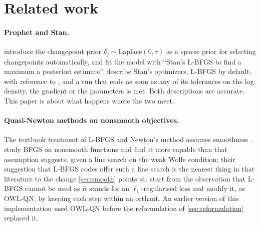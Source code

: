 \section{Related work}
\label{sec:related}

\paragraph{Prophet and Stan.}
\citet{taylor2018forecasting} introduce the changepoint prior
$\delta_j \sim \mathrm{Laplace}(0, \tau)$ as a sparse prior for selecting
changepoints automatically, and fit the model with ``Stan's L-BFGS to find a
maximum a posteriori estimate''. \citet{carpenter2017stan} describe Stan's
optimizers, L-BFGS by default, with reference to \citet{nocedal2006numerical}, and a
run that ends as soon as any of its tolerances on the log density, the gradient or
the parameters is met. Both descriptions are accurate. This paper is about what
happens where the two meet.

\paragraph{Quasi-Newton methods on nonsmooth objectives.}
The textbook treatment of L-BFGS and Newton's method assumes smoothness
\citep{nocedal2006numerical}. \citet{lewis2013nonsmooth} study BFGS on nonsmooth
functions and find it more capable than that assumption suggests, given a line
search on the weak Wolfe condition; their suggestion that L-BFGS codes offer such a
line search is the nearest thing in that literature to the change
\cref{sec:smooth} points at. \citet{andrew2007scalable} start from the observation
that L-BFGS cannot be used as it stands for an $\ell_1$-regularised loss and modify
it, as OWL-QN, by keeping each step within an orthant. An earlier version of this
implementation used OWL-QN before the reformulation of \cref{sec:reformulation}
replaced it.

